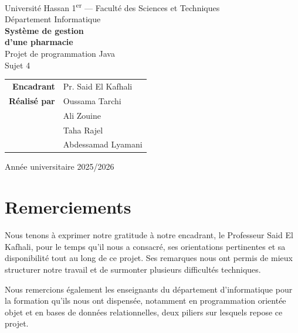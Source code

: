 \documentclass[12pt,a4paper]{report}
\begin{document}
\begin{titlepage}
\centering
\vspace*{2cm}

{\large Université Hassan 1\textsuperscript{er} --- Faculté des Sciences et Techniques}\\[0.3cm]
{\large Département Informatique}\\[2.5cm]

{\Huge\bfseries\color{bleutitre} Système de gestion\\[0.3cm] d'une pharmacie}\\[1.5cm]

{\Large Projet de programmation Java}\\[0.4cm]
{\large Sujet 4}\\[2cm]

\begin{tabular}{rl}
\textbf{Encadrant}     & Pr. Said El Kafhali \\[6pt]
\textbf{Réalisé par}   & Oussama Tarchi \\
                        & Ali Zouine \\
                        & Taha Rajel \\
                        & Abdessamad Lyamani \\
\end{tabular}

\vfill
{\large Année universitaire 2025/2026}
\end{titlepage}

\chapter*{Remerciements}

Nous tenons à exprimer notre gratitude à notre encadrant, le Professeur Said El Kafhali, pour le temps qu'il nous a consacré, ses orientations pertinentes et sa disponibilité tout au long de ce projet. Ses remarques nous ont permis de mieux structurer notre travail et de surmonter plusieurs difficultés techniques.

Nous remercions également les enseignants du département d'informatique pour la formation qu'ils nous ont dispensée, notamment en programmation orientée objet et en bases de données relationnelles, deux piliers sur lesquels repose ce projet.
\end{document}

